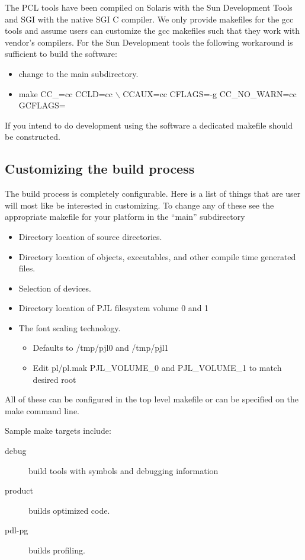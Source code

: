 \documentclass[10pt]{article}
\begin{document}
The PCL tools have been compiled on Solaris with the Sun Development
Tools and SGI with the native SGI C compiler. We only provide
makefiles for the gcc tools and assume users can customize the gcc
makefiles such that they work with vendor's compilers. For the Sun
Development tools the following workaround is sufficient to build the
software:

\begin{itemize}
\item change to the main subdirectory.
\item make CC\_=cc CCLD=cc $\backslash$ CCAUX=cc CFLAGS=-g CC\_NO\_WARN=cc GCFLAGS= 
\end{itemize}

If you intend to do development using the software a dedicated
makefile should be constructed.

\subsection*{Customizing the build process}

The build process is completely configurable. Here is a list of
things that are user will most like be interested in customizing.  To
change any of these see the appropriate makefile for your platform in
the ``main'' subdirectory

\begin{itemize}
\item  Directory location of source directories.
\item  Directory location of objects, executables, and other compile time generated files.
\item  Selection of devices.
\item  Directory location of PJL filesystem volume 0 and 1
\item  The font scaling technology.
\begin{itemize}
\item  Defaults to /tmp/pjl0 and /tmp/pjl1
\item  Edit pl/pl.mak PJL\_VOLUME\_0 and PJL\_VOLUME\_1 to match desired root
\end{itemize}

\end{itemize}

All of these can be configured in the top level makefile or can be
specified on the make command line.

Sample make targets include: 
\begin{description}
\item[debug] build tools with symbols and debugging information
\item[product] builds optimized code.
\item[pdl-pg] builds profiling.
\end{description}
\end{document}
